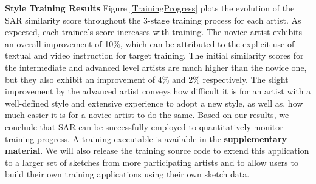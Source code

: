 

\noindent\textbf{Style Training Results} Figure \ref{TrainingProgress} plots the evolution of the SAR similarity score throughout the 3-stage training process for each artist. As expected, each trainee's score increases with training. The novice artist exhibits an overall improvement of 10\%, which can be attributed to the explicit use of textual and video instruction for target training. The initial similarity scores for the intermediate and advanced level artists are much higher than the novice one, but they also exhibit an improvement of 4\% and 2\% respectively. The slight improvement by the advanced artist conveys how difficult it is for an artist with a well-defined style and extensive experience to adopt a new style, as well as, how much easier it is for a novice artist to do the same. Based on our results, we conclude that SAR can be successfully employed to quantitatively monitor training progress. A training executable is available in the \textbf{supplementary material}. We will also release the training source code to extend this application to a larger set of sketches from more participating artists and to allow users to build their own training applications using their own sketch data.



